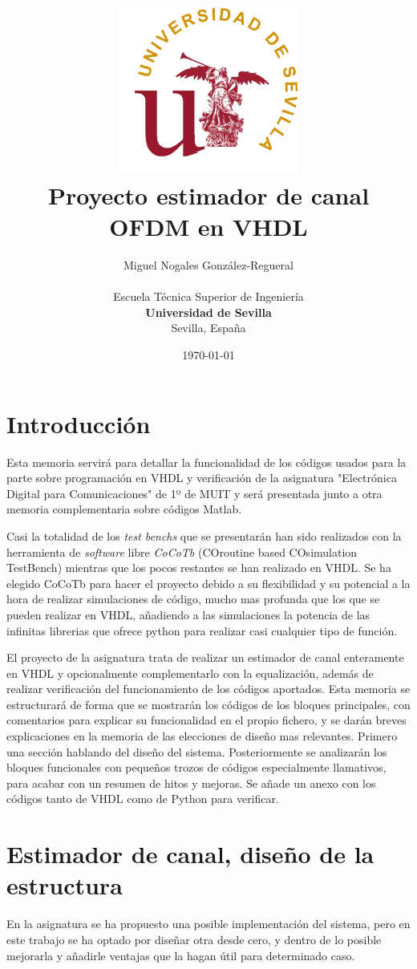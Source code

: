 \documentclass[11pt]{scrartcl} %
\title{
\includegraphics[width=6cm]{Figures/Logo_US.png} \\
\vspace*{1in}
\textbf{Proyecto estimador de canal OFDM en VHDL}}
\author{Miguel Nogales González-Regueral \\
		\vspace*{0.5in} \\
		Escuela Técnica Superior de Ingeniería\\
        \textbf{Universidad de Sevilla}\\
        Sevilla, España
       } \date{\today}
\begin{document}
\begin{preview}

\maketitle %

\Newpage

\section{Introducción}

Esta memoria servirá para detallar la funcionalidad de los códigos usados para la parte sobre programación en VHDL y verificación de la asignatura "Electrónica Digital para Comunicaciones" de 1º de MUIT y será presentada junto a otra memoria complementaria sobre códigos Matlab. 

Casi la totalidad de los \emph{test benchs} que se presentarán han sido realizados con la herramienta de \emph{software} libre \emph{CoCoTb} (COroutine based COsimulation TestBench) mientras que los pocos restantes se han realizado en VHDL. Se ha elegido CoCoTb para hacer el proyecto debido a su flexibilidad y su potencial a la hora de realizar simulaciones de código, mucho mas profunda que los que se pueden realizar en VHDL, añadiendo a las simulaciones la potencia de las infinitas librerias que ofrece python para realizar casi cualquier tipo de función.

El proyecto de la asignatura trata de realizar un estimador de canal enteramente en VHDL y opcionalmente complementarlo con la equalización, además de realizar verificación del funcionamiento de los códigos aportados. Esta memoria se estructurará de forma que se mostrarán los códigos de los bloques principales, con comentarios para explicar su funcionalidad en el propio fichero, y se darán breves explicaciones en la memoria de las elecciones de diseño mas relevantes. Primero una sección hablando del diseño del sistema. Posteriormente se analizarán los bloques funcionales con pequeños trozos de códigos especialmente llamativos, para acabar con un resumen de hitos y mejoras. Se añade un anexo con los códigos tanto de VHDL como de Python para verificar.

\section{Estimador de canal, diseño de la estructura}

En la asignatura se ha propuesto una posible implementación del sistema, pero en este trabajo se ha optado por diseñar otra desde cero, y dentro de lo posible mejorarla y añadirle ventajas que la hagan útil para determinado caso.


\end{preview}
\end{document}
